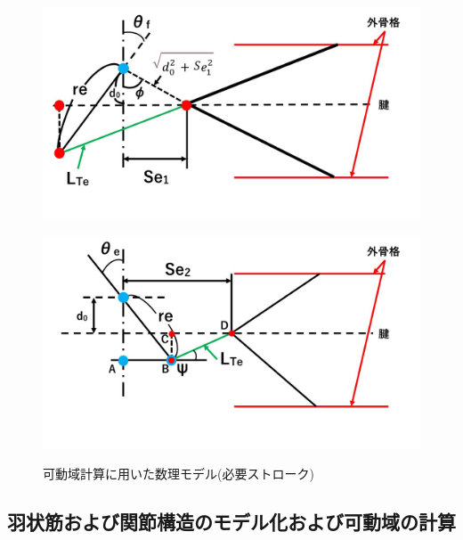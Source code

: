 \begin{figure}[ht]
  \begin{minipage}{0.49\hsize}
    \centering  
    \includegraphics[scale=0.23]{image/model_1.jpg}
    \label{fig:model_1_before}
  \end{minipage}
  \begin{minipage}{0.49\hsize}
    \centering
    \includegraphics[scale=0.23]{image/model_2.jpg}
    \label{fig:model_1_after}
  \end{minipage}
  \caption{可動域計算に用いた数理モデル(必要ストローク)}
  \label{fig:model_1}
\end{figure}
\subsection{羽状筋および関節構造のモデル化および可動域の計算}
